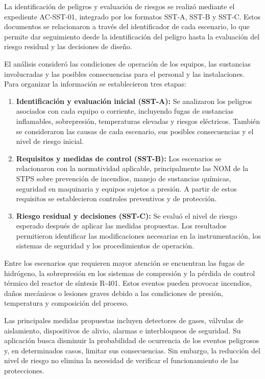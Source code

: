 \documentclass[11pt,letterpaper]{article}
\begin{document}
La identificación de peligros y evaluación de riesgos
se realizó mediante el expediente AC-SST-01, integrado
por los formatos SST-A, SST-B y SST-C. Estos documentos
se relacionaron a través del identificador de cada
escenario, lo que permite dar seguimiento desde la
identificación del peligro hasta la evaluación del
riesgo residual y las decisiones de diseño.

El análisis consideró las condiciones de operación
de los equipos, las sustancias involucradas y las
posibles consecuencias para el personal y las
instalaciones. Para organizar la información se
establecieron tres etapas:

\begin{enumerate}
    \item \textbf{Identificación y evaluación inicial
    (SST-A):} Se analizaron los peligros asociados
    con cada equipo o corriente, incluyendo fugas
    de sustancias inflamables, sobrepresión,
    temperaturas elevadas y riesgos eléctricos.
    También se consideraron las causas de cada
    escenario, sus posibles consecuencias y el
    nivel de riesgo inicial.

    \item \textbf{Requisitos y medidas de control
    (SST-B):} Los escenarios se relacionaron con
    la normatividad aplicable, principalmente las
    NOM de la STPS sobre prevención de incendios,
    manejo de sustancias químicas, seguridad en
    maquinaria y equipos sujetos a presión.
    A partir de estos requisitos se establecieron
    controles preventivos y de protección.

    \item \textbf{Riesgo residual y decisiones
    (SST-C):} Se evaluó el nivel de riesgo esperado
    después de aplicar las medidas propuestas.
    Los resultados permitieron identificar las
    modificaciones necesarias en la instrumentación,
    los sistemas de seguridad y los procedimientos
    de operación.
\end{enumerate}

Entre los escenarios que requieren mayor atención
se encuentran las fugas de hidrógeno, la sobrepresión
en los sistemas de compresión y la pérdida de control
térmico del reactor de síntesis R-401. Estos eventos
pueden provocar incendios, daños mecánicos o lesiones
graves debido a las condiciones de presión,
temperatura y composición del proceso.

Las principales medidas propuestas incluyen detectores
de gases, válvulas de aislamiento, dispositivos de
alivio, alarmas e interbloqueos de seguridad.
Su aplicación busca disminuir la probabilidad de
ocurrencia de los eventos peligrosos y, en determinados
casos, limitar sus consecuencias. Sin embargo, la
reducción del nivel de riesgo no elimina la necesidad
de verificar el funcionamiento de las protecciones.
\end{document}
